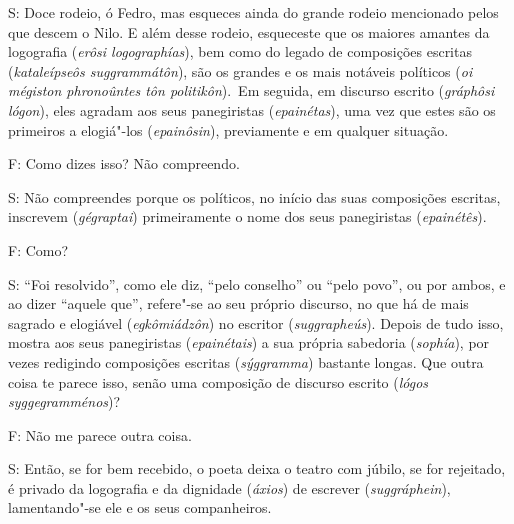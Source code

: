 S: Doce rodeio, ó Fedro, mas esqueces ainda do grande rodeio mencionado
pelos que descem o Nilo. \bekker{[257e]} E além desse rodeio, esqueceste que
os maiores amantes da logografia (\emph{erôsi logographías}), bem como
do legado de composições escritas (\emph{kataleípseôs suggrammátôn}),
são os grandes e os mais notáveis políticos (\emph{oi mégiston
phronoûntes tôn politikôn}).~Em seguida, em discurso escrito
(\emph{gráphôsi lógon}), eles agradam aos seus panegiristas
(\emph{epainétas}), uma vez que estes são os primeiros a elogiá"-los
(\emph{epainôsin}), previamente e em qualquer situação.

F: Como dizes isso? Não compreendo.

\bekker{[258a]} S: Não compreendes porque os políticos, no início das suas
composições escritas, inscrevem (\emph{gégraptai}) primeiramente o nome
dos seus panegiristas (\emph{epainétês}).

F: Como?

S: ``Foi resolvido'', como ele diz, ``pelo conselho'' ou ``pelo povo'',
ou por ambos, e ao dizer ``aquele que'', refere"-se ao seu próprio
discurso, no que há de mais sagrado e elogiável (\emph{egkômiádzôn}) no
escritor (\emph{suggrapheús}). Depois de tudo isso, mostra aos seus
panegiristas (\emph{epainétais}) a sua própria sabedoria
(\emph{sophía}), por vezes redigindo composições escritas
(\emph{sýggramma}) bastante longas. Que outra coisa te parece isso,
senão uma composição de discurso escrito (\emph{lógos syggegramménos})?

F: Não me parece outra coisa.

S: Então, se for bem recebido, o poeta deixa o teatro com júbilo, se for
rejeitado, é privado da logografia e da dignidade (\emph{áxios}) de
escrever (\emph{suggráphein}), lamentando"-se ele e os seus companheiros.

